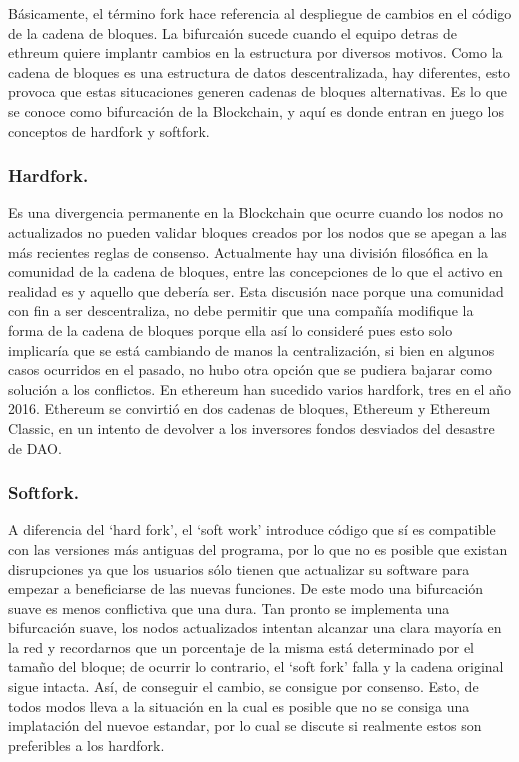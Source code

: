 \documentclass[11pt,a4paper]{article}
\begin{document}
Básicamente, el término fork hace referencia al despliegue de cambios en el código de la cadena de bloques. La bifurcaión sucede cuando el equipo detras de ethreum quiere implantr cambios en la estructura por diversos motivos. Como la cadena de bloques es una estructura de datos descentralizada, hay diferentes, esto provoca que estas situcaciones generen cadenas de bloques alternativas. Es lo que se conoce como bifurcación de la Blockchain, y aquí es donde entran en juego los conceptos de hardfork y softfork.\\

\subsubsection{Hardfork.}
\label{sec:hardfork}
Es una divergencia permanente en la Blockchain que ocurre cuando los nodos no actualizados no pueden validar bloques creados por los nodos que se apegan a las más recientes reglas de consenso. Actualmente hay una división filosófica en la comunidad  de la cadena de bloques, entre las concepciones de lo que el activo en realidad es y aquello que debería ser. Esta discusión nace porque una comunidad con fin a ser descentraliza, no debe permitir que una compañía modifique la forma de la cadena de bloques porque ella así lo consideré pues esto solo implicaría que se está cambiando de manos la centralización, si bien en algunos casos ocurridos en el pasado, no hubo otra opción que se pudiera bajarar como solución a los conflictos. En ethereum han sucedido varios hardfork, tres en el año 2016. Ethereum se convirtió en dos cadenas de bloques, Ethereum y Ethereum Classic, en un intento de devolver a los inversores fondos desviados del desastre de DAO.


\subsubsection{Softfork.}
A diferencia del ‘hard fork’, el ‘soft work’ introduce código que sí es compatible con las versiones más antiguas del programa, por lo que no es posible que existan disrupciones ya que los usuarios sólo tienen que actualizar su software para empezar a beneficiarse de las nuevas funciones. De este modo una bifurcación suave es menos conflictiva que una dura.  Tan pronto se implementa una bifurcación suave, los nodos actualizados intentan alcanzar una clara mayoría en la red y recordarnos que un porcentaje de la misma está determinado por el tamaño del bloque; de ocurrir lo contrario, el ‘soft fork’ falla y la cadena original sigue intacta. Así, de conseguir el cambio, se consigue por consenso. Esto, de todos modos lleva a la situación en la cual es posible que no se consiga una implatación del nuevoe estandar, por lo cual se discute si realmente estos son preferibles a los hardfork.
\end{document}

